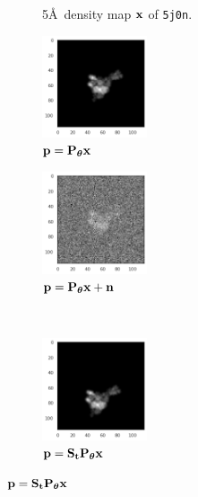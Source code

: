 \begin{figure}[ht!]
\begin{minipage}[b]{0.50\linewidth}
\begin{subfigure}[b]{0.49\linewidth}
            \caption{5\AA\ density map $\mathbf{x}$ of \texttt{5j0n}.}
        \end{subfigure}
        \caption{%
            Two proteins with different symmetries.
        }\label{fig:pdb-proteins}
    \end{minipage}
    \hfill
    \begin{minipage}[b]{0.48\linewidth}
        \centering
        \begin{subfigure}[b]{0.49\linewidth}
            \centering
            \includegraphics[height=3cm]{figures/5j0n_noise0}
            \caption{$\mathbf{p} = \mathbf{P}_{{\boldsymbol{\theta}}} \mathbf{x}$}
        \end{subfigure}
        \hfill
        \begin{subfigure}[b]{0.49\linewidth}
            \centering
            \includegraphics[height=3cm]{figures/5j0n_noise16}
            \caption{$\mathbf{p} = \mathbf{P}_{{\boldsymbol{\theta}}} \mathbf{x} + \mathbf{n}$}
        \end{subfigure}
        \\ \vspace{0.5em}
        \begin{subfigure}[b]{0.49\linewidth}
            \centering
            \includegraphics[height=3cm]{figures/5j0n_translated}
            \caption{$\mathbf{p} = \mathbf{S}_{\mathbf{t}} \mathbf{P}_{{\boldsymbol{\theta}}} \mathbf{x}$}

\end{subfigure}
\end{minipage}
\end{figure}
